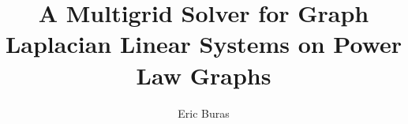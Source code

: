 \documentclass[12pt]{ruthesis}
\title{A Multigrid Solver for Graph Laplacian Linear Systems on Power Law Graphs}
\author{Eric Buras}
\begin{document}
\begin{frontmatter}








\end{frontmatter}
\begin{spacing}{1}


\end{spacing}
\end{document}
